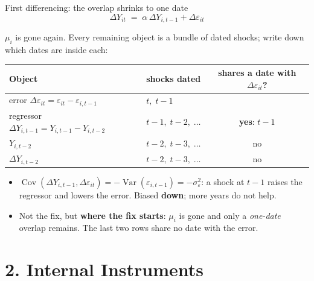 \documentclass[
  11pt,
  ignorenonframetext,
  aspectratio=169,
]{beamer}
\providecommand{\tightlist}{%
  \setlength{\itemsep}{0pt}\setlength{\parskip}{0pt}}
\begin{document}
\begin{frame}{First differencing: the overlap shrinks to one date}
\protect{}\label{first-differencing-the-overlap-shrinks-to-one-date}
\[
\Delta Y_{it} \;=\; \alpha\,\Delta Y_{i,t-1} + \Delta\varepsilon_{it}
\]

\(\mu_i\) is gone again. Every remaining object is a bundle of dated
shocks; write down which dates are inside each:

\begin{center}\footnotesize
\begin{tabular}{llc}
\toprule
Object & shocks dated & shares a date with $\Delta\varepsilon_{it}$? \\
\midrule
error $\Delta\varepsilon_{it} = \varepsilon_{it} - \varepsilon_{i,t-1}$ & $t,\; t-1$ & \\
regressor $\Delta Y_{i,t-1} = Y_{i,t-1} - Y_{i,t-2}$ & $t-1,\; t-2,\; \dots$ & \textbf{yes}: $t-1$ \\
$Y_{i,t-2}$ & $t-2,\; t-3,\; \dots$ & no \\
$\Delta Y_{i,t-2}$ & $t-2,\; t-3,\; \dots$ & no \\
\bottomrule
\end{tabular}
\end{center}

\begin{itemize}
\tightlist
\item
  \(\operatorname{Cov}(\Delta Y_{i,t-1}, \Delta\varepsilon_{it}) = -\operatorname{Var}(\varepsilon_{i,t-1}) = -\sigma^2_\varepsilon\):
  a shock at \(t-1\) raises the regressor and lowers the error. Biased
  \textbf{down}; more years do not help.
\end{itemize}

\begin{itemize}
\tightlist
\item
  Not the fix, but \textbf{where the fix starts}: \(\mu_i\) is gone and
  only a \emph{one-date} overlap remains. The last two rows share no
  date with the error.
\end{itemize}
\end{frame}

\section{2. Internal Instruments}\label{internal-instruments}
\end{document}

